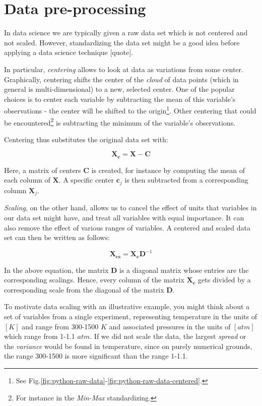 \documentclass[10pt,twocolumn]{article}
\begin{document}
\section{Data pre-processing}

In data science we are typically given a raw data set which is not centered and not scaled. However, standardizing the data set might be a good idea before applying a data science technique [quote].

In particular, \textit{centering} allows to look at data as variations from some center. Graphically, centering shifts the center of the \textit{cloud} of data points (which in general is multi-dimensional) to a new, selected center. One of the popular choices is to center each variable by subtracting the mean of this variable's observations - the center will be shifted to the origin\footnote{See Fig.\ref{fig:python-raw-data}-\ref{fig:python-raw-data-centered}.}.
Other centering that could be encountered\footnote{For instance in the \textit{Min-Max} standardizing.} is subtracting the minimum of the variable's observations.

Centering thus substitutes the original data set with:

\begin{equation}
\bm{X_c} = \bm{X} - \bm{C}
\end{equation}

Here, a matrix of centers $\bm{C}$ is created, for instance by computing the mean of each column of $\bm{X}$. A specific center $\bm{c}_j$ is then subtracted from a corresponding column $\bm{X}_j$.

\textit{Scaling}, on the other hand, allows us to cancel the effect of units that variables in our data set might have, and treat all variables with equal importance. It can also remove the effect of various ranges of variables. A centered and scaled data set can then be written as follows:

\begin{equation}
\bm{X_{cs}} = \bm{X_c}\bm{D}^{-1}
\end{equation}

In the above equation, the matrix $\bm{D}$ is a diagonal matrix whose entries are the corresponding scalings. Hence, every column of the matrix $\bm{X_c}$ gets divided by a corresponding scale from the diagonal of the matrix $\bm{D}$.

To motivate data scaling with an illustrative example, you might think about a set of variables from a single experiment, representing temperature in the units of $[K]$ and range from 300-1500 $K$ and associated pressures in the units of $[atm]$ which range from 1-1.1 $atm$. If we did not scale the data, the largest \textit{spread} or the \textit{variance} would be found in temperature, since on purely numerical grounds, the range 300-1500 is more significant than the range 1-1.1.
\end{document}
